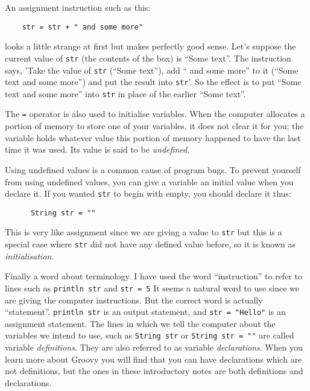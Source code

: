 An assignment instruction such as this:

\begin{Verbatim}
    str = str + " and some more"
\end{Verbatim}

looks a little strange at first but makes perfectly good sense.
Let's suppose the current value of \verb!str! (the contents of the
box) is ``Some text''.
The instruction says, 'Take the value of \verb!str!
(``Some text''), add `` and some more''  to it (``Some text and some
more'') 
and put the result into \verb!str!'.
So the effect is to put ``Some text and some more'' into \verb!str! in
place of the earlier ``Some text''.

The \verb!=! operator is also used to initialise variables.  When the computer
allocates a portion of memory to store one of your variables, it does not
clear it for you; the variable holds whatever value this portion of memory
happened to have the last time it was used.  Its value is said to be
\emph{undefined.}

Using undefined values is a common cause of program
bugs.  %
%
To prevent yourself from using undefined values, you can give a variable
an initial value when you declare it.  If you wanted \verb!str! to begin
with empty, you should declare it thus:

\begin{Verbatim}
      String str = ""
\end{Verbatim}

This is very like assignment since we are giving a value to \verb!str! but
this is a special case where \verb!str! did not have any defined value before,
so it is known as \emph{initialisation.}

Finally a word about terminology.  I have used the word ``instruction''
to refer to lines such as \verb!println str! and \verb!str = 5!
It seems a natural word to use since we are giving the computer instructions.
But the correct word is actually ``statement''.  \verb!println str! is
an output statement, and \verb!str = "Hello"! is an assignment statement.
The lines in which we tell the computer about the variables we intend to
use, such as \verb!String str! or \verb!String str = ""! are called
variable \emph{definitions}.  They are also referred to as 
variable \emph{declarations}.  When you learn more about Groovy you will
find that you can have declarations which are not definitions, but the
ones in these introductory notes are both definitions and declarations.

